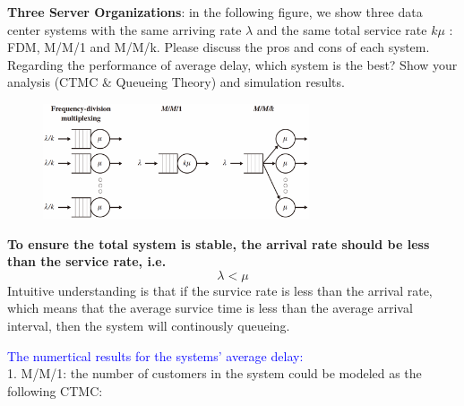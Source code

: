 \begin{homeworkProblem}

\textbf{Three Server Organizations}: in the following figure, we show three data center systems with the same arriving rate $\lambda$ and the same total service rate $k \mu$ : FDM, M/M/1 and M/M/k. Please discuss the pros and cons of each system. Regarding the performance of average delay, which system is the best? Show your analysis (CTMC \& Queueing Theory) and simulation results.

\begin{figure}[h]
    \centering
    \includegraphics[width=0.7\textwidth]{./figure/servers.png}
\end{figure}

\solution

\textbf{To ensure the total system is stable, the arrival rate should be less than the  service rate, i.e.} $$\lambda < \mu$$
Intuitive understanding is that if the survice rate is less than the arrival rate, which means that the average survice time is less than the average arrival interval, then the system will continously queueing.

\textcolor{blue}{The numertical results for the systems' average delay:} \\
1. M/M/1: the number of customers in the system could be modeled as the following CTMC:
\begin{center}
\end{center}
\end{homeworkProblem}
